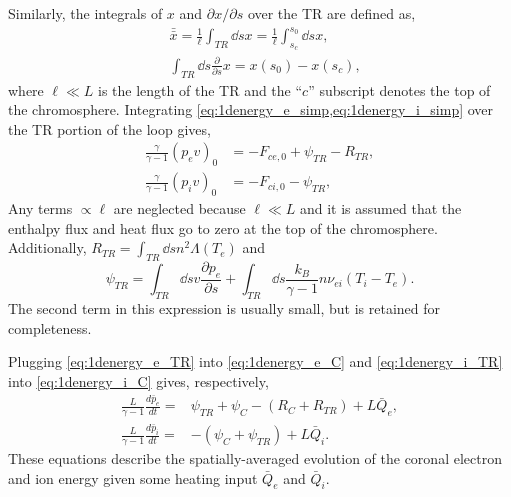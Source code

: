 Similarly, the integrals of $x$ and $\partial x/\partial s$ over the TR are defined as,
\begin{align}
    &\bar{\bar{x}} = \frac{1}{\ell}\int_{TR}\dd{s}x = \frac{1}{\ell}\int_{s_c}^{s_0}\dd{s}x,\nonumber \\
    &\int_{TR}\dd{s}\frac{\partial}{\partial s}x = x(s_0) - x(s_c),\nonumber
\end{align}
where $\ell\ll L$ is the length of the TR and the ``$c$'' subscript denotes the top of the chromosphere. Integrating \cref{eq:1denergy_e_simp,eq:1denergy_i_simp} over the TR portion of the loop gives,
\begin{align}
    \frac{\gamma}{\gamma - 1}(p_ev)_0 &= - F_{ce,0} + \psi_{TR} - R_{TR}, \label{eq:1denergy_e_TR} \\
    \frac{\gamma}{\gamma - 1}(p_iv)_0 &=  - F_{ci,0} - \psi_{TR}, \label{eq:1denergy_i_TR}
\end{align}
Any terms $\propto\ell$ are neglected because $\ell\ll L$ \citep{klimchuk_highly_2008} and it is assumed that the enthalpy flux and heat flux go to zero at the top of the chromosphere. Additionally, $R_{TR}=\int_{TR}\dd{s}n^2\Lambda(T_e)$ and
\begin{equation}\label{eq:psi_tr_full}
    \psi_{TR}=\int_{TR}\dd{s}v\frac{\partial p_e}{\partial s} + \int_{TR}\dd{s}\frac{k_B}{\gamma - 1}n\nu_{ei}(T_i - T_e).
\end{equation}
The second term in this expression is usually small, but is retained for completeness.

Plugging \cref{eq:1denergy_e_TR} into \autoref{eq:1denergy_e_C} and \autoref{eq:1denergy_i_TR} into \autoref{eq:1denergy_i_C} gives, respectively,
\begin{align}
    \frac{L}{\gamma - 1}\frac{d\bar{p}_e}{dt} =& \psi_{TR} + \psi_C -(R_C + R_{TR}) + L\bar{Q}_{e},\label{eq:0d_press_e_sub} \\
    \frac{L}{\gamma - 1}\frac{d\bar{p}_i}{dt} =& -(\psi_{C} + \psi_{TR}) +  L\bar{Q}_{i}.\label{eq:0d_press_i_sub}
\end{align}
These equations describe the spatially-averaged evolution of the coronal electron and ion energy given some heating input $\bar{Q}_e$ and $\bar{Q}_i$. 

